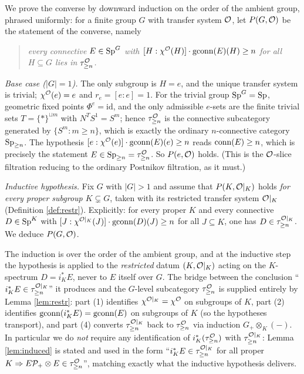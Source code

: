 We prove the converse by downward induction on the order of the ambient group,
phrased uniformly: for a finite group $G$ with transfer system $\mathcal{O}$, let
$P(G,\mathcal{O})$ be the statement of the converse, namely
\begin{quote}
\emph{every connective $E\in\mathrm{Sp}^G$ with $[H:\chi^{\mathcal{O}}(H)]\cdot\operatorname{gconn}(E)(H)\ge n$
for all $H\subseteq G$ lies in $\tau^{\mathcal{O}}_{\ge n}$.}
\end{quote}
\medskip
\noindent\emph{Base case ($|G|=1$).} The only subgroup is $H=e$, and the unique
transfer system is trivial; $\chi^{\mathcal{O}}(e)=e$ and $r_e=[e:e]=1$. For the trivial
group $\mathrm{Sp}^G=\mathrm{Sp}$, geometric fixed points $\Phi^e=\mathrm{id}$, and the only
admissible $e$-sets are the finite trivial sets $T=\{\ast\}^{\sqcup m}$ with
$N^TS^1=S^m$; hence $\tau^{\mathcal{O}}_{\ge n}$ is the connective subcategory generated by
$\{S^m:m\ge n\}$, which is exactly the ordinary $n$-connective category
$\mathrm{Sp}_{\ge n}$. The hypothesis $[e:\chi^{\mathcal{O}}(e)]\cdot\operatorname{gconn}(E)(e)\ge n$ reads
$\operatorname{conn}(E)\ge n$, which is precisely the statement $E\in\mathrm{Sp}_{\ge n}=
\tau^{\mathcal{O}}_{\ge n}$. So $P(e,\mathcal{O})$ holds. (This is the $\mathcal{O}$-slice filtration
reducing to the ordinary Postnikov filtration, as it must.)

\medskip
\noindent\emph{Inductive hypothesis.} Fix $G$ with $|G|>1$ and assume that
$P(K,\mathcal{O}|_K)$ holds \emph{for every proper subgroup $K\subsetneq G$}, taken with
its restricted transfer system $\mathcal{O}|_K$ (Definition \ref{def:restr}). Explicitly:
for every proper $K$ and every connective $D\in\mathrm{Sp}^K$ with
$[J:\chi^{\mathcal{O}|_K}(J)]\cdot\operatorname{gconn}(D)(J)\ge n$ for all $J\subseteq K$, one has
$D\in\tau^{\mathcal{O}|_K}_{\ge n}$. We deduce $P(G,\mathcal{O})$.

\begin{qfiveremark}\label{rem:ind-link}
The induction is over the order of the ambient group, and at the inductive step
the hypothesis is applied to the \emph{restricted} datum $(K,\mathcal{O}|_K)$ acting on
the $K$-spectrum $D=i_K^\ast E$, never to $E$ itself over $G$. The bridge between
the conclusion ``$i_K^\ast E\in\tau^{\mathcal{O}|_K}_{\ge n}$'' it produces and the
$G$-level subcategory $\tau^{\mathcal{O}}_{\ge n}$ is supplied entirely by Lemma
\ref{lem:restr}: part (1) identifies $\chi^{\mathcal{O}|_K}=\chi^{\mathcal{O}}$ on subgroups of
$K$, part (2) identifies $\operatorname{gconn}(i_K^\ast E)=\operatorname{gconn}(E)$ on subgroups of $K$
(so the hypotheses transport), and part (4) converts $\tau^{\mathcal{O}|_K}_{\ge n}$ back
to $\tau^{\mathcal{O}}_{\ge n}$ via induction $G_+\otimes_K(-)$. In particular we do
\emph{not} require any identification of $i_K^\ast(\tau^{\mathcal{O}}_{\ge n})$ with
$\tau^{\mathcal{O}|_K}_{\ge n}$: Lemma \ref{lem:induced} is stated and used in the form
``$i_K^\ast E\in\tau^{\mathcal{O}|_K}_{\ge n}$ for all proper $K\Rightarrow E\mathcal
P_+\otimes E\in\tau^{\mathcal{O}}_{\ge n}$'', matching exactly what the inductive hypothesis
delivers.
\end{qfiveremark}

